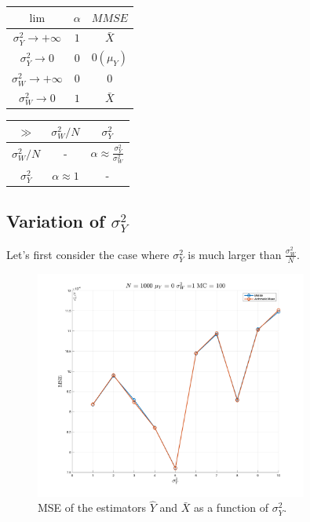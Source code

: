\begin{table}[H]
    \centering
    \begin{tabular}{|c|c|c|}
        \hline
        $\lim$                 & $\alpha$ & $MMSE$      \\
        \hline
        $\sigma^2_Y\to+\infty$ & $1$      & $\bar X$    \\
        $\sigma^2_Y\to 0$      & $0$      & $0 (\mu_Y)$ \\
        $\sigma^2_W\to+\infty$ & $0$      & $0$         \\
        $\sigma^2_W\to 0$      & $1$      & $\bar X$    \\
        \hline
    \end{tabular}
    \quad
    \begin{tabular}{|c|c|c|}
        \hline
        $\gg$          & $\sigma^2_W/N$     & $\sigma^2_Y$                                   \\
        \hline
        $\sigma^2_W/N$ & -                  & $\alpha \approx \frac{\sigma^2_Y}{\sigma^2_W}$ \\
        $\sigma^2_Y$   & $\alpha \approx 1$ & -                                              \\
        \hline
    \end{tabular}
    \label{tab:mmse}
\end{table}

\subsection*{Variation of $\sigma^2_Y$}
Let's first consider the case where $\sigma^2_Y$ is much larger than $\frac {\sigma^2_W}N$.

\begin{figure}[H]
    \centering
    \includegraphics[width=0.8\textwidth]{./figures/appendix_a/figure_6.png}
    \caption{MSE of the estimators $\hat Y$ and $\bar X$ as a function of $\sigma^2_Y$.}
    \label{fig:mmse_sigma_y}
\end{figure}

